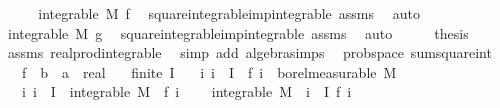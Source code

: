 \begin{isabellebody}
%
\isadelimproof
%
\endisadelimproof
%
\isatagproof
{}\isamarkupfalse%
\ {\isacharminus}{\kern0pt}\isanewline
\ \ \isamarkupfalse%
\ {\isachardoublequoteopen}integrable\ M\ f{\isachardoublequoteclose}\ \isamarkupfalse%
\ square{\isacharunderscore}{\kern0pt}integrable{\isacharunderscore}{\kern0pt}imp{\isacharunderscore}{\kern0pt}integrable\ assms\ \isamarkupfalse%
\ auto\isanewline
\ \ \isamarkupfalse%
\ \isamarkupfalse%
\ {\isachardoublequoteopen}integrable\ M\ g{\isachardoublequoteclose}\ \isamarkupfalse%
\ square{\isacharunderscore}{\kern0pt}integrable{\isacharunderscore}{\kern0pt}imp{\isacharunderscore}{\kern0pt}integrable\ assms\ \isamarkupfalse%
\ auto\isanewline
\ \ \isamarkupfalse%
\ \isamarkupfalse%
\ {\isacharquery}{\kern0pt}thesis\ \isamarkupfalse%
\ assms\ real{\isacharunderscore}{\kern0pt}prod{\isacharunderscore}{\kern0pt}integrable\ \isamarkupfalse%
\ {\isacharparenleft}{\kern0pt}simp\ add{\isacharcolon}{\kern0pt}\ algebra{\isacharunderscore}{\kern0pt}simps{\isacharparenright}{\kern0pt}\isanewline
{}\isamarkupfalse%
%
\endisatagproof
{\isafoldproof}%
%
\isadelimproof
\isanewline
%
\endisadelimproof
\isanewline
{}\isamarkupfalse%
\ {\isacharparenleft}{\kern0pt}\ prob{\isacharunderscore}{\kern0pt}space{\isacharparenright}{\kern0pt}\ sum{\isacharunderscore}{\kern0pt}square{\isacharunderscore}{\kern0pt}int{\isacharcolon}{\kern0pt}\isanewline
\ \ \ f\ {\isacharcolon}{\kern0pt}{\isacharcolon}{\kern0pt}\ {\isachardoublequoteopen}{\isacharprime}{\kern0pt}b\ {\isasymRightarrow}\ {\isacharprime}{\kern0pt}a\ {\isasymRightarrow}\ real{\isachardoublequoteclose}\isanewline
\ \ \ {\isachardoublequoteopen}finite\ I{\isachardoublequoteclose}\isanewline
\ \ \ {\isachardoublequoteopen}{\isasymAnd}i{\isachardot}{\kern0pt}\ i\ {\isasymin}\ I\ {\isasymLongrightarrow}\ f\ i\ {\isasymin}\ borel{\isacharunderscore}{\kern0pt}measurable\ M{\isachardoublequoteclose}\isanewline
\ \ \ {\isachardoublequoteopen}{\isasymAnd}i{\isachardot}{\kern0pt}\ i\ {\isasymin}\ I\ {\isasymLongrightarrow}\ integrable\ M\ {\isacharparenleft}{\kern0pt}{\isasymlambda}{\isasymomega}{\isachardot}{\kern0pt}\ f\ i\ {\isasymomega}{\isacharcircum}{\kern0pt}{}{\isacharparenright}{\kern0pt}{\isachardoublequoteclose}\isanewline
\ \ \ {\isachardoublequoteopen}integrable\ M\ {\isacharparenleft}{\kern0pt}{\isasymlambda}{\isasymomega}{\isachardot}{\kern0pt}\ {\isacharparenleft}{\kern0pt}{\isasymSum}i\ {\isasymin}\ I{\isachardot}{\kern0pt}\ f\ i\ {\isasymomega}{\isacharparenright}{\kern0pt}\isanewline

\end{isabellebody}
